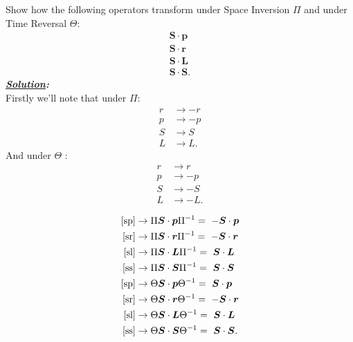 \documentclass[notitlepage]{report}
\begin{document}
\begin{question}[title = Question 4]{}{}
Show how the following operators transform under Space Inversion $\Pi$ and under Time Reversal $\Theta$:\\
\begin{gather}
	\boldsymbol{S}\cdot\boldsymbol{p}\label{sp}\\
	\boldsymbol{S}\cdot\boldsymbol{r}\label{sr}\\
	\boldsymbol{S}\cdot\boldsymbol{L}\label{sl}\\
	\boldsymbol{S}\cdot\boldsymbol{S}\label{ss}
.\end{gather}
\tcblower
\textbf{\emph{\underline{Solution}:}}\\
Firstly we'll note that under $\Pi $:\\
\begin{align*}
	r&\rightarrow -r\\	
	p&\rightarrow -p\\	
	S&\rightarrow S\\	
	L&\rightarrow L	
.\end{align*}
And under $\Theta$ :\\
\begin{align*}
	r&\rightarrow r\\	
	p&\rightarrow -p\\	
	S&\rightarrow -S\\	
	L&\rightarrow -L	
.\end{align*}

\begin{align*}
	\text{\eqref{sp}}&\rightarrow \Pi\boldsymbol{S}\cdot\boldsymbol{p}\Pi^{-1} =\ -\boldsymbol{S}\cdot\boldsymbol{p} \\
	\text{\eqref{sr}}&\rightarrow \Pi\boldsymbol{S}\cdot\boldsymbol{r}\Pi^{-1} =\ -\boldsymbol{S}\cdot\boldsymbol{r} \\
	\text{\eqref{sl}}&\rightarrow \Pi\boldsymbol{S}\cdot\boldsymbol{L}\Pi^{-1} =\ \boldsymbol{S}\cdot\boldsymbol{L} \\
	\text{\eqref{ss}}&\rightarrow \Pi\boldsymbol{S}\cdot\boldsymbol{S}\Pi^{-1} =\ \boldsymbol{S}\cdot\boldsymbol{S}\\
	\text{\eqref{sp}}&\rightarrow \Theta\boldsymbol{S}\cdot\boldsymbol{p}\Theta^{-1} =\ \boldsymbol{S}\cdot\boldsymbol{p} \\
	\text{\eqref{sr}}&\rightarrow \Theta\boldsymbol{S}\cdot\boldsymbol{r}\Theta^{-1} =\ -\boldsymbol{S}\cdot\boldsymbol{r} \\
	\text{\eqref{sl}}&\rightarrow \Theta\boldsymbol{S}\cdot\boldsymbol{L}\Theta^{-1} =\ \boldsymbol{S}\cdot\boldsymbol{L} \\
	\text{\eqref{ss}}&\rightarrow \Theta\boldsymbol{S}\cdot\boldsymbol{S}\Theta^{-1} =\ \boldsymbol{S}\cdot\boldsymbol{S}
.\end{align*}
\end{question}
\end{document}
